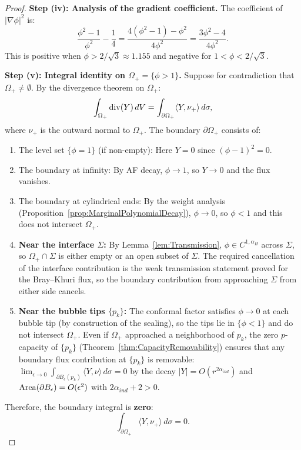 \begin{proof}
\textbf{Step (iv): Analysis of the gradient coefficient.}
The coefficient of $|\nabla\phi|^2$ is:
\begin{equation}
    \frac{\phi^2-1}{\phi^2} - \frac{1}{4} = \frac{4(\phi^2-1) - \phi^2}{4\phi^2} = \frac{3\phi^2 - 4}{4\phi^2}.
\end{equation}
This is positive when $\phi > 2/\sqrt{3} \approx 1.155$ and negative for $1 < \phi < 2/\sqrt{3}$.

\textbf{Step (v): Integral identity on $\Omega_+ = \{\phi > 1\}$.}
Suppose for contradiction that $\Omega_+ \neq \emptyset$. By the divergence theorem on $\Omega_+$:
\begin{equation}\label{eq:DivYPositive}
    \int_{\Omega_+} \mathrm{div}(Y) \, dV = \int_{\partial\Omega_+} \langle Y, \nu_+ \rangle \, d\sigma,
\end{equation}
where $\nu_+$ is the outward normal to $\Omega_+$. The boundary $\partial\Omega_+$ consists of:
\begin{enumerate}
    \item The level set $\{\phi = 1\}$ (if non-empty): Here $Y = 0$ since $(\phi-1)^2 = 0$.
    \item The boundary at infinity: By AF decay, $\phi \to 1$, so $Y \to 0$ and the flux vanishes.
    \item The boundary at cylindrical ends: By the weight analysis (Proposition~\ref{prop:MarginalPolynomialDecay}), $\phi \to 0$, so $\phi < 1$ and this does not intersect $\Omega_+$.
    \item \textbf{Near the interface $\Sigma$:} By Lemma~\ref{lem:Transmission}, $\phi \in C^{1,\alpha_H}$ across $\Sigma$, so $\Omega_+ \cap \Sigma$ is either empty or an open subset of $\Sigma$. The required cancellation of the interface contribution is the weak transmission statement proved for the Bray--Khuri flux, so the boundary contribution from approaching $\Sigma$ from either side cancels.
    \item \textbf{Near the bubble tips $\{p_k\}$:} The conformal factor satisfies $\phi \to 0$ at each bubble tip (by construction of the sealing), so the tips lie in $\{\phi < 1\}$ and do not intersect $\Omega_+$. Even if $\Omega_+$ approached a neighborhood of $p_k$, the zero $p$-capacity of $\{p_k\}$ (Theorem~\ref{thm:CapacityRemovability}) ensures that any boundary flux contribution at $\{p_k\}$ is removable: $\lim_{\epsilon \to 0} \int_{\partial B_\epsilon(p_k)} \langle Y, \nu \rangle \, d\sigma = 0$ by the decay $|Y| = O(r^{2\alpha_{ind}})$ and $\operatorname{Area}(\partial B_\epsilon) = O(\epsilon^2)$ with $2\alpha_{ind} + 2 > 0$.
\end{enumerate}
Therefore, the boundary integral is \textbf{zero}:
\begin{equation}
    \int_{\partial\Omega_+} \langle Y, \nu_+ \rangle \, d\sigma = 0.
\end{equation}


\end{proof}
